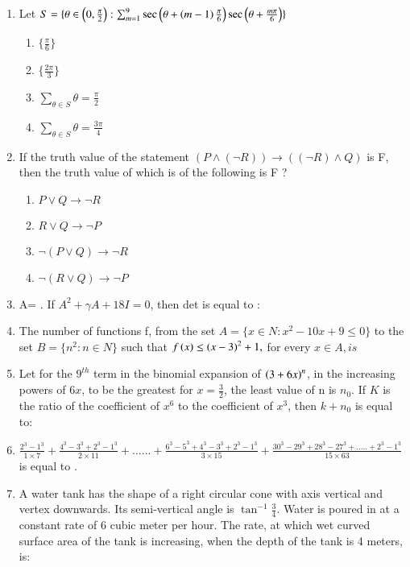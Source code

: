 \documentclass[journal]{IEEEtran}
\begin{document}
\begin{enumerate}
    \item Let $S=\{\theta \in \left(0,\frac{\pi}{2}\right) :\sum_{m=1}^{9}\sec \left(\theta+\left(m-1\right)\frac{\pi}{6}\right)\sec \left(\theta+\frac{m\pi}{6}\right)\}$
  \hfill{}
		\begin{multicols}{1}
			\begin{enumerate}
				\item $\{\frac{\pi}{6}\}$
				\item $\{\frac{2\pi}{3}\}$
				\item $\sum_{\theta \in S}\theta =\frac{\pi}{2}$
				\item $\sum_{\theta \in S}\theta =\frac{3\pi}{4}$
			\end{enumerate}
		\end{multicols}

    \item If the truth value of the statement $(P\land(\neg R))\rightarrow ((\neg R) \land Q)$ is F, then the truth value of which is of the following is F ?
    \hfill{}
		\begin{multicols}{1}
			\begin{enumerate}
				\item $P \lor Q \rightarrow \neg R$
				\item $R \lor Q \rightarrow \neg P$
				\item $\neg (P \lor Q) \rightarrow \neg R$
				\item $\neg (R \lor Q) \rightarrow \neg P$
			\end{enumerate}
		\end{multicols}

    \item A=  . If $A^2+\gamma A+ 18I=0$, then det is equal to :
    \hfill{}
    \item The number of functions f, from the set $A= \{x \in N: x^2-10x+9 \leq 0 \}$ to the set
    $B= \{ n^2 : n\in N\}$ such that $f\left(x\right)\leq
     \left(x-3\right)^2+1,$ for every $x \in A, is $
    \hfill{}
    \item Let for the $9^{th}$ term in the binomial expansion of $\left(3+6x\right)^n$, in the increasing powers of $6x$, to be the greatest for $x=\frac{3}{2}$, the least value of n is $n_0$.  If $K$ 
    is the ratio of the coefficient of $x^6$ to the coefficient of $x^3$, then $k+n_0$ is equal to:
  \hfill{}

    \item $\frac{2^3-1^3}{1\times7} + \frac{4^3-3^3+2^3-1^3}{2\times 11} +......+\frac{6^3-5^3+4^3-3^3+2^3-1^3}{3\times 15} +\frac{30^3-29^3+28^3-27^3+.....+2^3-1^3}{15\times 63}$ is equal to .
\hfill{}
    \item A water tank has the shape of a right circular cone with axis vertical and vertex downwards. Its semi-vertical angle is $\tan^{-1}\frac{3}{4}$. Water is poured in at a constant rate of 6 cubic  meter per hour. The rate, at which wet curved surface area of the tank is increasing, when the depth of the tank is 4 meters, is:
    \hfill{}


\end{enumerate}
\end{document}
